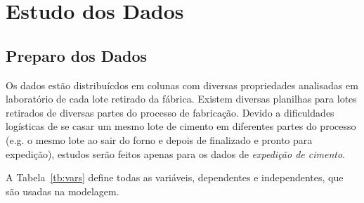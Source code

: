 \chapter{Estudo dos Dados}
\label{cap:estudodados}


\section{Preparo dos Dados}


Os dados estão distribuícdos em colunas com diversas propriedades analisadas em
laboratório de cada lote retirado da fábrica. Existem diversas planilhas para
lotes retirados de diversas partes do processo de fabricação. Devido a dificuldades logísticas de se casar um
mesmo lote de cimento em diferentes partes do processo (e.g. o mesmo lote ao
sair do forno e depois de finalizado e pronto para expedição), estudos serão feitos apenas para os dados de
\textit{expedição de cimento}. 

A Tabela~\ref{tb:vars} define todas as variáveis, dependentes e independentes,
que são usadas na modelagem.


\begin{table}[]
\caption{Variáveis presentes nos dados de expedição de cimento cedidos pela Intercement}
\label{tb:vars}
\end{table}

